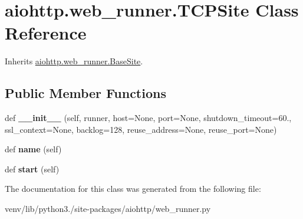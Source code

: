 \hypertarget{classaiohttp_1_1web__runner_1_1_t_c_p_site}{}\section{aiohttp.\+web\+\_\+runner.\+T\+C\+P\+Site Class Reference}
\label{classaiohttp_1_1web__runner_1_1_t_c_p_site}


Inherits \hyperlink{classaiohttp_1_1web__runner_1_1_base_site}{aiohttp.\+web\+\_\+runner.\+Base\+Site}.

\subsection*{Public Member Functions}
\begin{DoxyCompactItemize}
\item 
\mbox{\label{classaiohttp_1_1web__runner_1_1_t_c_p_site_a171203f525814a5aa60d4dc50b52f8bf}} 
def {\bfseries \+\_\+\+\_\+init\+\_\+\+\_\+} (self, runner, host=None, port=None, shutdown\+\_\+timeout=60., ssl\+\_\+context=None, backlog=128, reuse\+\_\+address=None, reuse\+\_\+port=None)
\item 
\mbox{\label{classaiohttp_1_1web__runner_1_1_t_c_p_site_abd9172219879532376e72f1b5941e558}} 
def {\bfseries name} (self)
\item 
\mbox{\label{classaiohttp_1_1web__runner_1_1_t_c_p_site_a73a1b3d08a28313b7b84f249a87497a4}} 
def {\bfseries start} (self)
\end{DoxyCompactItemize}


The documentation for this class was generated from the following file\+:\begin{DoxyCompactItemize}
\item 
venv/lib/python3./site-\/packages/aiohttp/web\+\_\+runner.\+py\end{DoxyCompactItemize}
